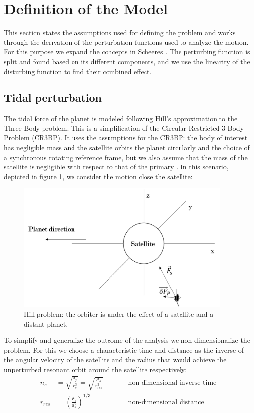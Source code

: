 \section{Definition of the Model}
This section states the assumptions used for defining the problem and works through the derivation of the perturbation functions used to analyze the motion. For this purpose we expand the concepts in Scheeres \cite{scheeres2012orbital}. The perturbing function is split and found based on its different components, and we use the linearity of the disturbing function to find their combined effect.

\subsection{Tidal perturbation}
The tidal force of the planet is modeled following Hill's approximation to the Three Body problem. This is a simplification of the Circular Restricted 3 Body Problem (CR3BP). It uses the assumptions for the CR3BP: the body of interest has negligible mass and the satellite orbits the planet circularly and the choice of a synchronous rotating reference frame, but we also assume that the mass of the satellite is negligible with respect to that of the primary \cite{nakazawa1988hill}. In this scenario, depicted in figure \ref{fig:vectorDiagram}, we consider the motion close the satellite:

\begin{figure}[h]
	\centering
	\includegraphics[height=2.5in]	
	{figures/1-vectorDiagram.png}
	\caption{Hill problem: the orbiter is under the effect of a satellite and a distant planet.}
	\label{fig:vectorDiagram}
\end{figure}

To simplify and generalize the outcome of the analysis we non-dimensionalize the problem. For this we choose a characteristic time and distance as the inverse of the angular velocity of the satellite and the radius that would achieve the unperturbed resonant orbit around the satellite respectively:
\begin{align}
n_s &= \sqrt{\frac{\mu_p}{r_s^3}} = \sqrt{\frac{\mu_s}{r_{res}^3}} \qquad && \text{non-dimensional inverse time} \\
r_{res} &= \left(\frac{\mu_s}{n_s^2}\right)^{1/3} && \text{non-dimensional distance} 
\end{align}

